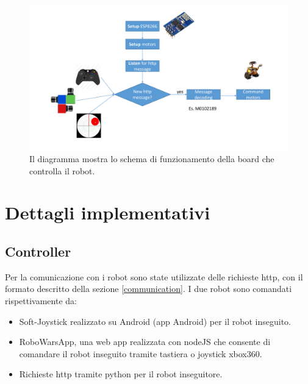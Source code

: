 \documentclass [11pt ,a4paper]{report}
\begin{document}
\begin{figure}
	\centering
		\hspace*{-4.9cm}\includegraphics[width=1.7\textwidth]{Images/img.pdf}
		\caption{Il diagramma mostra lo schema di funzionamento della board che controlla il robot.}
	\label{fig:img}
\end{figure}

\newpage

\chapter{Dettagli implementativi}

\section{Controller}

Per la comunicazione con i robot sono state utilizzate delle richieste http, con il formato descritto della sezione \ref{communication}. I due robot sono comandati rispettivamente da:	
\begin{itemize}
\item Soft-Joystick realizzato su Android (app Android) per il robot inseguito.
\item RoboWarsApp, una web app realizzata con nodeJS che consente di comandare il robot inseguito tramite tastiera o joystick xbox360.
\item Richieste http tramite python per il robot inseguitore.
\end{itemize}
\end{document}
